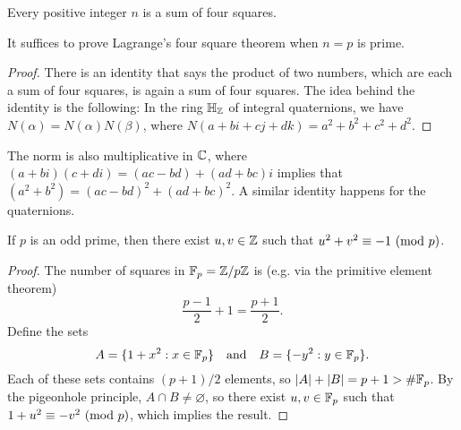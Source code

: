 \begin{theorem}[Lagrange]\label{thm:lagrange-squares}
  Every positive integer $n$ is a sum of four squares.
\end{theorem}

\begin{lemma}
  It suffices to prove Lagrange's four square theorem
  when $n = p$ is prime.
\end{lemma}

\begin{proof}
  There is an identity that says the product of two numbers,
  which are each a sum of four squares, is again a sum of
  four squares. The idea behind the identity is the following:
  In the ring $\mathbb{H}_{\mathbb{Z}}$ of integral quaternions, we have
  $N(\alpha) = N(\alpha) N(\beta)$, where
  $N(a + bi + cj + dk) = a^2 + b^2 + c^2 + d^2$.
\end{proof}

\begin{remark}
  The norm is also multiplicative in $\mathbb{C}$, where
  $(a + bi)(c + di) = (ac - bd) + (ad + bc)i$
  implies that $(a^2 + b^2) = (ac - bd)^2 + (ad + bc)^2$.
  A similar identity happens for the quaternions.
\end{remark}

\begin{lemma}
  If $p$ is an odd prime, then there exist $u,v \in \mathbb{Z}$
  such that $u^2 + v^2 \equiv -1 \ (\mathrm{mod}\ p)$.
\end{lemma}

\begin{proof}
  The number of squares in $\mathbb{F}_p = \mathbb{Z} / p\mathbb{Z}$ is
  (e.g. via the primitive element theorem)
  \[
    \frac{p - 1}{2} + 1 = \frac{p + 1}{2}.
  \]
  Define the sets
  \[
    A = \{1 + x^2 : x \in \mathbb{F}_p\} \quad \text{and} \quad
    B = \{-y^2 : y \in \mathbb{F}_p\}.
  \]
  Each of these sets contains $(p + 1) / 2$ elements, so
  $|A| + |B| = p + 1 > \#\mathbb{F}_p$. By the pigeonhole principle,
  $A \cap B \ne \varnothing$, so there exist $u, v \in \mathbb{F}_p$
  such that $1 + u^2 \equiv -v^2 \ (\mathrm{mod}\ p)$, which
  implies the result.
\end{proof}

